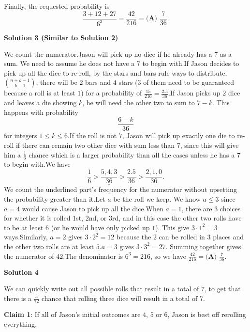 \begin{enumerate}
\begin{itemize}
            \end{itemize}
            Finally, the requested probability is 
 \[\frac{3+12+27}{6^3}=\frac{42}{216}=\boxed{\textbf{(A) } \frac{7}{36}}.\]




\textbf{Solution 3 (Similar to Solution 2)}

We count the numerator.Jason will pick up no dice if he already has a $7$ as a sum. We need to assume he does not have a $7$ to begin with.If Jason decides to pick up all the dice to re-roll, by the stars and bars rule ways to distribute, ${n+k-1 \choose k-1}$, there will be $2$ bars and $4$ stars ($3$ of them need to be guaranteed because a roll is at least $1$) for a probability of $\frac{15}{216}=\frac{2.5}{36}$.If Jason picks up $2$ dice and leaves a die showing $k$, he will need the other two to sum to $7-k$. This happens with probability 
 \[\frac{6-k}{36}\] for integers $1 \leq k \leq 6$.If the roll is not $7$, Jason will pick up exactly one die to re-roll if there can remain two other dice with sum less than $7$, since this will give him a $\frac{1}{6}$ chance which is a larger probability than all the cases unless he has a $7$ to begin with.We have 
 \[\frac{1}{6} > \underline{\frac{5,4,3}{36}} > \frac{2.5}{36} > \frac{2,1,0}{36}.\]We count the underlined part's frequency for the numerator without upsetting the probability greater than it.Let $a$ be the roll we keep. We know $a\leq3$ since $a=4$ would cause Jason to pick up all the dice.When $a=1$, there are $3$ choices for whether it is rolled $1$st, $2$nd, or $3$rd, and in this case the other two rolls have to be at least $6$ (or he would have only picked up $1$). This give $3 \cdot 1^{2} =3$ ways.Similarly, $a=2$ gives $3 \cdot 2^{2} =12$ because the $2$ can be rolled in $3$ places and the other two rolls are at least $5$.$a=3$ gives $3 \cdot 3^{2} =27$. Summing together gives the numerator of $42$.The denominator is $6^3=216$, so we have $\frac{42}{216}=\boxed{\textbf{(A) } \frac{7}{36}}$.

 



\textbf{Solution 4}

We can quickly write out all possible rolls that result in a total of $7$, to get that there is a $\frac{5}{72}$ chance that rolling three dice will result in a total of $7$.

 \textbf{Claim 1}: If all of Jason's initial outcomes are $4$, $5$ or $6$, Jason is best off rerolling everything.


\end{enumerate}
